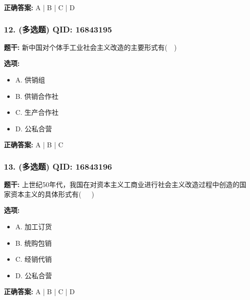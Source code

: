 \documentclass[12pt,UTF8]{ctexart}
\begin{document}
\textbf{正确答案:}
A | B | C | D

\vspace{0.3em}\hrulefill\vspace{0.7em}

\subsubsection*{12. (多选题) \small QID: 16843195}

\textbf{题干:}
新中国对个体手工业社会主义改造的主要形式有(  )

\textbf{选项:}
\begin{itemize}[leftmargin=*]

  \item A. 供销组

  \item B. 供销合作社

  \item C. 生产合作社

  \item D. 公私合营

\end{itemize}

\textbf{正确答案:}
A | B | C

\vspace{0.3em}\hrulefill\vspace{0.7em}

\subsubsection*{13. (多选题) \small QID: 16843196}

\textbf{题干:}
上世纪50年代，我国在对资本主义工商业进行社会主义改造过程中创造的国家资本主义的具体形式有(   )

\textbf{选项:}
\begin{itemize}[leftmargin=*]

  \item A. 加工订货

  \item B. 统购包销

  \item C. 经销代销

  \item D. 公私合营

\end{itemize}

\textbf{正确答案:}
A | B | C | D

\vspace{0.3em}\hrulefill\vspace{0.7em}
\end{document}
